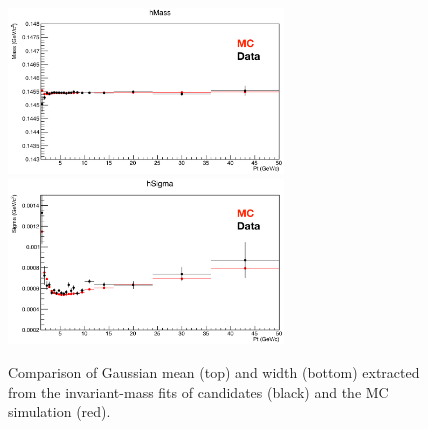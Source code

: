 

\begin{figure}[tb]
\begin{center}
 \includegraphics[width=0.65\textwidth]{figures/Dstar/pp13TeV/DstarMean-position.png}
 \includegraphics[width=0.65\textwidth]{figures/Dstar/pp13TeV/DstarWidth_sigma.png}
\caption{Comparison of Gaussian mean (top) and width (bottom) extracted from the invariant-mass fits of \Dstar
candidates (black) and the MC simulation (red).}
\label{fig:Dstar_Mean_width}
\end{center}
\end{figure}

